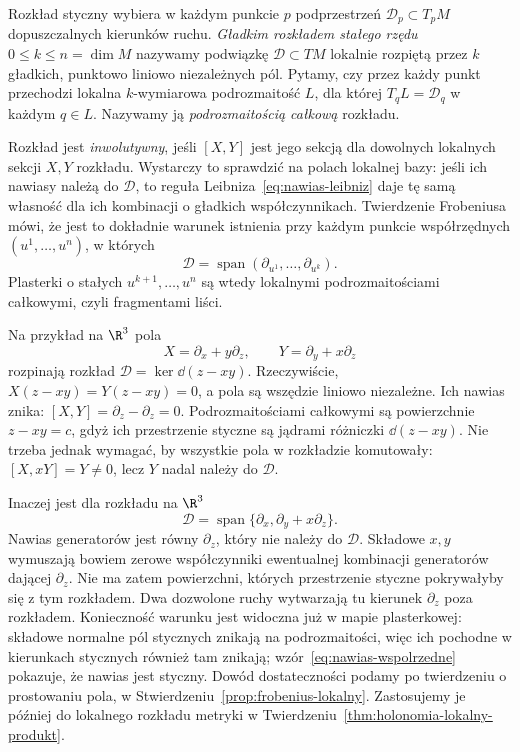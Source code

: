 \begin{uwaga}
Rozkład styczny wybiera w każdym punkcie $p$ podprzestrzeń
$\mathcal D_p\subset T_pM$ dopuszczalnych kierunków ruchu.
\emph{Gładkim rozkładem stałego rzędu} $0\leq k\leq n=\dim M$
nazywamy podwiązkę $\mathcal D\subset TM$ lokalnie rozpiętą
przez $k$ gładkich, punktowo liniowo niezależnych pól.
Pytamy, czy przez każdy punkt przechodzi lokalna
$k$-wymiarowa podrozmaitość $L$, dla której
$T_qL=\mathcal D_q$ w każdym $q\in L$.
Nazywamy ją \emph{podrozmaitością całkową} rozkładu.

Rozkład jest \emph{inwolutywny}, jeśli $[X,Y]$ jest jego sekcją
dla dowolnych lokalnych sekcji $X,Y$ rozkładu.
Wystarczy to sprawdzić na polach lokalnej bazy:
jeśli ich nawiasy należą do $\mathcal D$, to reguła
Leibniza~\eqref{eq:nawias-leibniz} daje tę samą własność
dla ich kombinacji o gładkich współczynnikach.
Twierdzenie Frobeniusa mówi, że jest to dokładnie warunek
istnienia przy każdym punkcie współrzędnych $(u^1,\ldots,u^n)$,
w których
\[
 \mathcal D=\operatorname{span}
 (\partial_{u^1},\ldots,\partial_{u^k}).
\]
Plasterki o stałych $u^{k+1},\ldots,u^n$ są wtedy lokalnymi
podrozmaitościami całkowymi, czyli fragmentami liści.

Na przykład na $\R^3$ pola
\[
 X=\partial_x+y\partial_z,\qquad
 Y=\partial_y+x\partial_z
\]
rozpinają rozkład $\mathcal D=\ker\dd(z-xy)$.
Rzeczywiście, $X(z-xy)=Y(z-xy)=0$, a pola są wszędzie
liniowo niezależne. Ich nawias znika:
$[X,Y]=\partial_z-\partial_z=0$.
Podrozmaitościami całkowymi są powierzchnie $z-xy=c$,
gdyż ich przestrzenie styczne są jądrami różniczki $\dd(z-xy)$.
Nie trzeba jednak wymagać, by wszystkie pola w rozkładzie
komutowały: $[X,xY]=Y\ne0$, lecz $Y$ nadal należy do
$\mathcal D$.

Inaczej jest dla rozkładu na $\R^3$
\[
 \mathcal D
 =\operatorname{span}\{\partial_x,\partial_y+x\partial_z\}.
\]
Nawias generatorów jest równy $\partial_z$, który nie należy do $\mathcal D$.
Składowe $x,y$ wymuszają bowiem zerowe współczynniki
ewentualnej kombinacji generatorów dającej $\partial_z$.
Nie ma zatem powierzchni, których przestrzenie styczne pokrywałyby się
z tym rozkładem. Dwa dozwolone ruchy wytwarzają tu
kierunek $\partial_z$ poza rozkładem.
Konieczność warunku jest widoczna już w mapie
plasterkowej: składowe normalne pól stycznych znikają na
podrozmaitości, więc ich pochodne w kierunkach stycznych również
tam znikają; wzór~\eqref{eq:nawias-wspolrzedne} pokazuje,
że nawias jest styczny. Dowód dostateczności podamy po twierdzeniu
o prostowaniu pola, w Stwierdzeniu~\ref{prop:frobenius-lokalny}.
Zastosujemy je później do lokalnego rozkładu metryki
w Twierdzeniu~\ref{thm:holonomia-lokalny-produkt}.
\end{uwaga}

